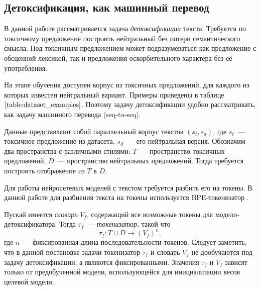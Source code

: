 \subsection{Детоксификация, как машинный перевод}
\label{section:machine_translation}
В данной работе рассматривается задача \textit{детоксификации} текста. 
Требуется по токсичному предложение построить нейтральный без потери семантического смысла. 
Под токсичным предложением может подразумеваться как предложение с обсценной лексикой, так и предложения оскорбительного характера без её употребления.

На этапе обучения доступен корпус из токсичных предложений, для каждого из которых известен нейтральный вариант.
Примеры приведены в таблице $\ref{table:dataset_examples}$.
Поэтому задачу детоксификации удобно рассматривать, как задачу машинного перевода (seq-to-seq). 

Данные представляют собой параллельный корпус текстов $(s_t, s_d)$, где $s_t$~--- токсичное предложение из датасета, $s_d$~--- его нейтральная версия. 
Обозначим два пространства с различными стилями: $T$~--- пространство токсичных предложений, $D$~--- пространство нейтральных предложений.
Тогда требуется построить отображение из $T$ в $D$.

Для работы нейросетевых моделей с текстом требуется разбить его на токены. 
В данной работе для разбиения текста на токены используется BPE-токенизатор \cite{bpe}. 

Пускай имеется \textit{словарь} $V_f$, содержащий все возможные токены для модели-детоксификатора.
Тогда $\tau_f$~--- \textit{токенизатор}, такой что $$\tau_f: T \cup D \to \left(V_f\right)^{n},$$ где $n$~--- фиксированная длина последовательности токенов.  
Следует заметить, что в данной постановке задачи токенизатор $\tau_{f}$ и словарь $V_{f}$ не дообучаются под задачу детоксификации, а являются фиксированными. 
Значения $\tau_{f}$ и $V_{f}$ зависят только от предобученной модели, использующейся для инициализации весов целевой модели.

